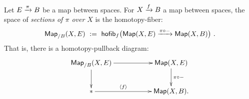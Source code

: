 %
%
%
%
%
%
%
%
%

\begin{definition} \label{def1}
Let $E\xrightarrow{\pi} B$ be a map between spaces.
For $X \xrightarrow{f} B$ a map between spaces, 
the space of \emph{sections of $\pi$ over $X$} is the homotopy-fiber:
\[
{\sf Map}_{/B}(X,E) 
~:=~ 
{\sf hofib}_{f}
\bigl(
{\sf Map}(X,E) \xrightarrow{ \pi \circ -} {\sf Map}(X,B) 
\bigr)
~.
\]
That is, there is a homotopy-pullback diagram:
\[
\xymatrix{
{\sf Map}_{/B}(X,E) 
\ar[rr]^-{} \ar[d]^-{}
&&
{\sf Map}(X,E)
\ar[d]^-{ \pi \circ -}
\\
\ast \ar[rr]^-{\langle f \rangle}
&&
{\sf Map}(X,B) 
.
}
\]
\end{definition}

